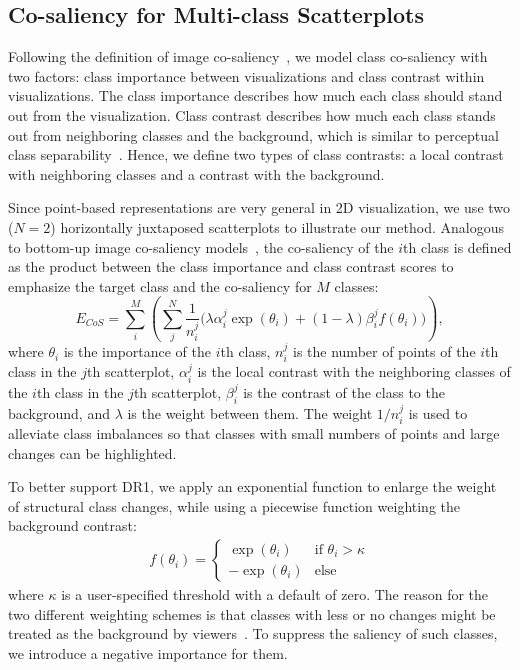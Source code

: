 \subsection{Co-saliency for Multi-class Scatterplots }
Following the definition of image co-saliency~\cite{Jacobs10}, we model class co-saliency with two factors: class importance between visualizations and class contrast within visualizations. The class importance describes how much each class should stand out from the visualization.
Class contrast describes how much each class stands out from neighboring classes and the background,
which is similar to perceptual class separability~\cite{Aupetit02,Wang2018}. Hence,
we define two types of class contrasts: a local contrast with neighboring classes and a contrast with the background.

Since point-based representations are very general in 2D visualization, we use two ($N=2$) horizontally juxtaposed scatterplots to illustrate our method.
Analogous to bottom-up image co-saliency models~\cite{Jacobs10,Fu13}, the co-saliency of the $i$th class is defined as the product between the class importance and  class contrast scores to emphasize the target class and the co-saliency for $M$ classes:
\begin{equation}
E_{CoS} = \sum_i^M    \left(\sum_j^N \frac{1}{n^j_i}\bigg(\lambda \alpha^j_i\exp(\theta_i) + (1-\lambda) \beta^j_i f(\theta_i) \bigg) \right),
	\label{eq:cosaliency}
\end{equation}
where $\theta_i$ is the importance of the $i$th class,
$n^j_i$ is the number of points of the $i$th class in the $j$th scatterplot,
$\alpha^j_i$ is the local contrast with the neighboring classes of the $i$th class in the $j$th scatterplot, $\beta^j_i$  is the contrast of the class to the background, and $\lambda$ is the weight between them. The weight $1/{n^j_i}$  is used to alleviate class imbalances  so that  classes with small numbers of points and large changes can be highlighted.

To better support DR1, we apply an exponential function to enlarge the weight of structural class changes, while using a piecewise function weighting the background contrast:
\begin{align}
f(\theta_i) =  \left\{ \begin{array}{ll}
\exp(\theta_i) & \textrm{if $\theta_i>\kappa$}\\
-\exp(\theta_i) & \textrm{else}
\end{array} \right.
\label{eq:energyfunc}
\end{align}
where $\kappa$ is a user-specified threshold with a default of zero. The reason for the two different weighting schemes is that classes with less or no changes might be treated as the background by viewers~\cite{zhang2018review}. To suppress the saliency of such classes, we introduce a negative importance for them.

